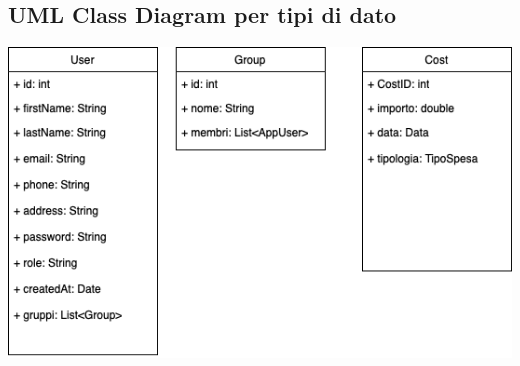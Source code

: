 \subsection{UML Class Diagram per tipi di dato}

\begin{center}
    \includegraphics[scale=0.55]{images/TipoDatiClassDiagramV1.1.png}

\end{center}


